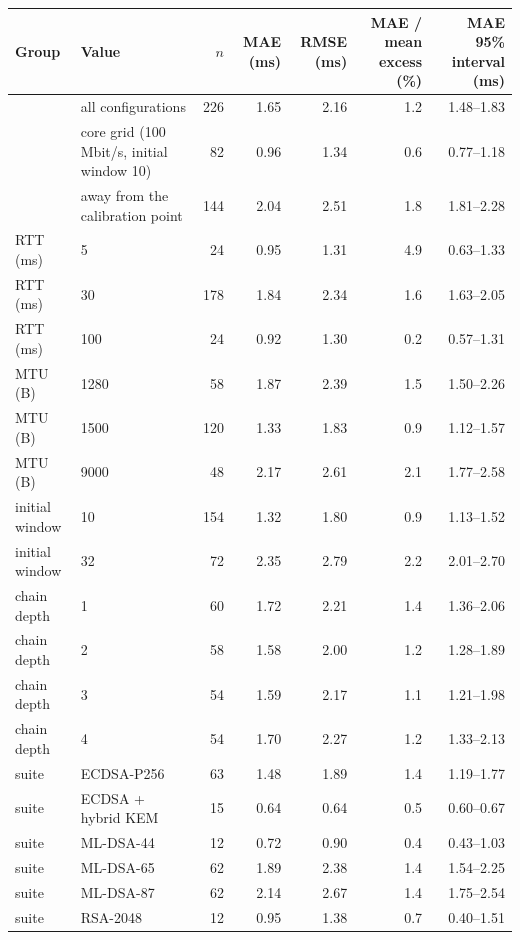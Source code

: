 \begin{tabular}{@{}llrrrrr@{}}
\toprule
Group & Value & $n$ & MAE (ms) & RMSE (ms) & MAE / mean excess (\%) & MAE 95\% interval (ms) \\
\midrule
 & all configurations & 226 & 1.65 & 2.16 & 1.2 & 1.48--1.83 \\
\midrule
 & core grid (100 Mbit/s, initial window 10) & 82 & 0.96 & 1.34 & 0.6 & 0.77--1.18 \\
 & away from the calibration point & 144 & 2.04 & 2.51 & 1.8 & 1.81--2.28 \\
\midrule
RTT (ms) & 5 & 24 & 0.95 & 1.31 & 4.9 & 0.63--1.33 \\
RTT (ms) & 30 & 178 & 1.84 & 2.34 & 1.6 & 1.63--2.05 \\
RTT (ms) & 100 & 24 & 0.92 & 1.30 & 0.2 & 0.57--1.31 \\
\midrule
MTU (B) & 1280 & 58 & 1.87 & 2.39 & 1.5 & 1.50--2.26 \\
MTU (B) & 1500 & 120 & 1.33 & 1.83 & 0.9 & 1.12--1.57 \\
MTU (B) & 9000 & 48 & 2.17 & 2.61 & 2.1 & 1.77--2.58 \\
\midrule
initial window & 10 & 154 & 1.32 & 1.80 & 0.9 & 1.13--1.52 \\
initial window & 32 & 72 & 2.35 & 2.79 & 2.2 & 2.01--2.70 \\
\midrule
chain depth & 1 & 60 & 1.72 & 2.21 & 1.4 & 1.36--2.06 \\
chain depth & 2 & 58 & 1.58 & 2.00 & 1.2 & 1.28--1.89 \\
chain depth & 3 & 54 & 1.59 & 2.17 & 1.1 & 1.21--1.98 \\
chain depth & 4 & 54 & 1.70 & 2.27 & 1.2 & 1.33--2.13 \\
\midrule
suite & ECDSA-P256 & 63 & 1.48 & 1.89 & 1.4 & 1.19--1.77 \\
suite & ECDSA + hybrid KEM & 15 & 0.64 & 0.64 & 0.5 & 0.60--0.67 \\
suite & ML-DSA-44 & 12 & 0.72 & 0.90 & 0.4 & 0.43--1.03 \\
suite & ML-DSA-65 & 62 & 1.89 & 2.38 & 1.4 & 1.54--2.25 \\
suite & ML-DSA-87 & 62 & 2.14 & 2.67 & 1.4 & 1.75--2.54 \\
suite & RSA-2048 & 12 & 0.95 & 1.38 & 0.7 & 0.40--1.51 \\
\bottomrule
\end{tabular}
